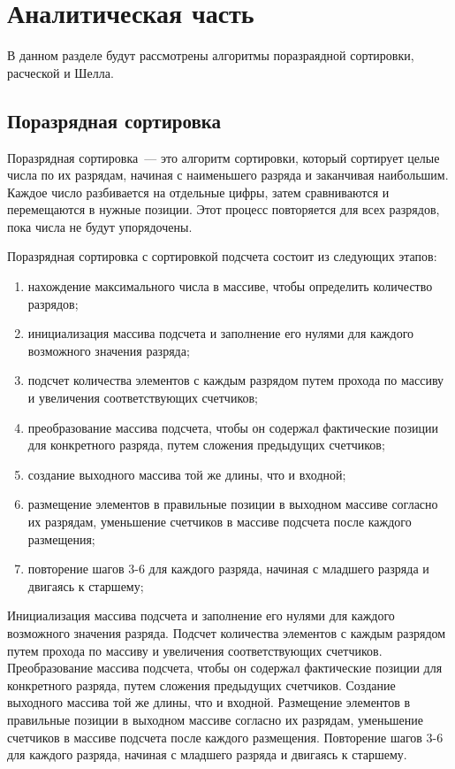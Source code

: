 \chapter{Аналитическая часть}
В данном разделе будут рассмотрены алгоритмы поразраядной сортировки, расческой и Шелла.

\section{Поразрядная сортировка}
Поразрядная сортировка~--- это алгоритм сортировки, который сортирует целые числа по их разрядам, начиная с наименьшего разряда и заканчивая наибольшим. 
Каждое число разбивается на отдельные цифры, затем сравниваются и перемещаются в нужные позиции. 
Этот процесс повторяется для всех разрядов, пока числа не будут упорядочены.

Поразрядная сортировка с сортировкой подсчета состоит из следующих этапов:
\begin{enumerate}
	\item нахождение максимального числа в массиве, чтобы определить количество разрядов;
	\item инициализация массива подсчета и заполнение его нулями для каждого возможного значения разряда;
	\item подсчет количества элементов с каждым разрядом путем прохода по массиву и увеличения соответствующих счетчиков;
	\item преобразование массива подсчета, чтобы он содержал фактические позиции для конкретного разряда, путем сложения предыдущих счетчиков;
	\item создание выходного массива той же длины, что и входной;
	\item размещение элементов в правильные позиции в выходном массиве согласно их разрядам, уменьшение счетчиков в массиве подсчета после каждого размещения;
	\item повторение шагов 3-6 для каждого разряда, начиная с младшего разряда и двигаясь к старшему;
\end{enumerate}

Инициализация массива подсчета и заполнение его нулями для каждого возможного значения разряда.
Подсчет количества элементов с каждым разрядом путем прохода по массиву и увеличения соответствующих счетчиков.
Преобразование массива подсчета, чтобы он содержал фактические позиции для конкретного разряда, путем сложения предыдущих счетчиков.
Создание выходного массива той же длины, что и входной.
Размещение элементов в правильные позиции в выходном массиве согласно их разрядам, уменьшение счетчиков в массиве подсчета после каждого размещения.
Повторение шагов 3-6 для каждого разряда, начиная с младшего разряда и двигаясь к старшему.

